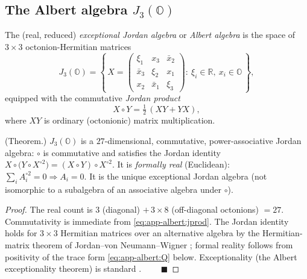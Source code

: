 \subsection{The Albert algebra \texorpdfstring{$J_3(\mathbb O)$}{J3(O)}}
\label{sec:app-albert:jalg}

\begin{definition}\label{def:app-albert:jalg}
The (real, reduced) \emph{exceptional Jordan algebra} or \emph{Albert algebra} is
the space of $3\times3$ octonion-Hermitian matrices
\begin{equation}\label{eq:app-albert:Xform}
  J_3(\mathbb O)=
  \left\{\,
  X=\begin{pmatrix}
      \xi_1 & x_3 & \bar x_2\\
      \bar x_3 & \xi_2 & x_1\\
      x_2 & \bar x_1 & \xi_3
    \end{pmatrix}
  :\ \xi_i\in\mathbb R,\ x_i\in\mathbb O
  \,\right\},
\end{equation}
equipped with the commutative \emph{Jordan product}
\begin{equation}\label{eq:app-albert:jprod}
  X\circ Y=\tfrac12\,(XY+YX),
\end{equation}
where $XY$ is ordinary (octonionic) matrix multiplication.
\end{definition}

\begin{theorem}\label{thm:app-albert:dim}
\textup{(Theorem.)}
$J_3(\mathbb O)$ is a $27$-dimensional, commutative, power-associative Jordan
algebra: $\circ$ is commutative and satisfies the Jordan identity
$X\circ\bigl(Y\circ X^{\circ 2}\bigr)=(X\circ Y)\circ X^{\circ 2}$. It is
\emph{formally real} (Euclidean): $\sum_i A_i^{\circ2}=0\Rightarrow A_i=0$. It is
the unique exceptional Jordan algebra (not isomorphic to a subalgebra of an
associative algebra under $\circ$).
\end{theorem}

\begin{proof}
The real count is $3$ (diagonal) $+\,3\times 8$ (off-diagonal octonions)
$=27$. Commutativity is immediate from \eqref{eq:app-albert:jprod}. The Jordan
identity holds for $3\times3$ Hermitian matrices over an alternative algebra by
the Hermitian-matrix theorem of Jordan--von Neumann--Wigner
\cite{JNW:1934,McCrimmon:2004}; formal reality follows from positivity of the
trace form \eqref{eq:app-albert:Q} below. Exceptionality (the Albert
exceptionality theorem) is standard \cite{Albert:1934,Schafer:1966}.
$\qquad\blacksquare$
\end{proof}

